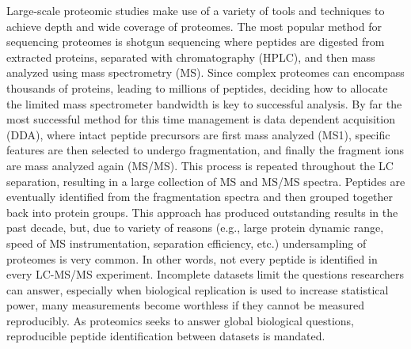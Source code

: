 Large-scale proteomic studies make use of a variety of tools and techniques to achieve depth and wide coverage of proteomes. The most popular method for sequencing proteomes is shotgun sequencing where peptides are digested from extracted proteins, separated with chromatography (HPLC), and then mass analyzed using mass spectrometry (MS).\cite{mudpit,mudpit2} Since complex proteomes can encompass thousands of proteins, leading to millions of peptides, deciding how to allocate the limited mass spectrometer bandwidth is key to successful analysis.\cite{100000} By far the most successful method for this time management is data dependent acquisition (DDA), where intact peptide precursors are first mass analyzed (MS1), specific \mz{} features are then selected to undergo fragmentation, and finally the fragment ions are mass analyzed again (MS/MS). This process is repeated throughout the LC separation, resulting in a large collection of MS and MS/MS spectra. Peptides are eventually identified from the fragmentation spectra and then grouped together back into protein groups.\cite{sequest,sadygov,venable,panda,grouping} This approach has produced outstanding results in the past decade, but, due to variety of reasons (e.g., large protein dynamic range, speed of MS instrumentation, separation efficiency, etc.) undersampling of proteomes is very common. In other words, not every peptide is identified in every LC-MS/MS experiment. Incomplete datasets limit the questions researchers can answer, especially when biological replication is used to increase statistical power, many measurements become worthless if they cannot be measured reproducibly.\cite{quant} As proteomics seeks to answer global biological questions, reproducible peptide identification between datasets is mandated.\cite{ideker,msbp,molloy}

